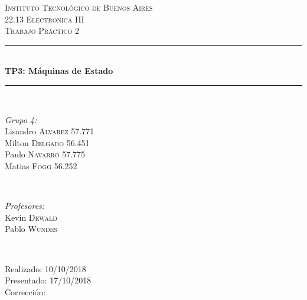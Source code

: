 \begin{titlepage}
\newcommand{\HRule}{\rule{\linewidth}{0.5mm}}
\center
\textsc{\LARGE Instituto Tecnológico de Buenos Aires}\\[1.5cm]
\textsc{\Large 22.13 Electronica III}\\[0.5cm]
\textsc{\large Trabajo Práctico 2}\\[0.5cm]

\HRule \\[0.4cm]
{ \huge \bfseries TP3: Máquinas de Estado}\\[0.4cm] %
\HRule \\[1.5cm]

\begin{minipage}{0.4\textwidth}
\begin{flushleft} \large
\emph{Grupo 4:}\\
Lisandro \textsc{Alvarez} 57.771\\
Milton \textsc{Delgado} 56.451\\
Paulo \textsc{Navarro} 57.775\\
Matias \textsc{Fogg} 56.252\\
\end{flushleft}
\end{minipage}
~
\begin{minipage}{0.4\textwidth}
\begin{flushright} \large
\emph{Profesores:} \\
Kevin \textsc{Dewald}\\
Pablo \textsc{Wundes}
\end{flushright}
\end{minipage}\\[4cm]

\begin{minipage}{0.4\textwidth}
\begin{flushleft} \large
Realizado: 10/10/2018\\
Presentado: 17/10/2018\\
Corrección:\\
\end{flushleft}
\end{minipage}
\vfill %

\end{titlepage}
